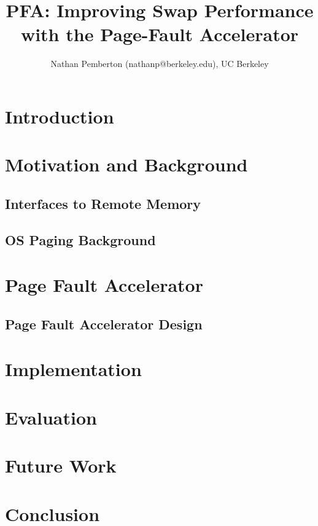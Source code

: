 \documentclass{article}
\begin{document}
\title{
PFA: Improving Swap Performance with the Page-Fault Accelerator}

\author{Nathan Pemberton (nathanp@berkeley.edu), UC Berkeley}

\date{}
\maketitle

\thispagestyle{empty}



\section{Introduction} \label{sec:intro}
    

\section{Motivation and Background}
    \subsection{Interfaces to Remote Memory} \label{sec:rmemApproaches}
        
    \subsection{OS Paging Background} \label{sec:pagingBackground}
        

\section{Page Fault Accelerator} \label{sec:pfa}
    
    \subsection{Page Fault Accelerator Design} \label{sec:pfaDesign}
        

\section{Implementation} \label{sec:impl}
    

\section{Evaluation} \label{sec:eval}
    

\section{Future Work} \label{sec:future}
    

\section{Conclusion} \label{sec:conclusion}
    


\nocite{*}
\newpage


\end{document}
